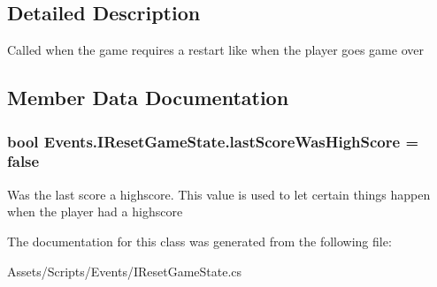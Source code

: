 \subsection{Detailed Description}
Called when the game requires a restart like when the player goes game over 



\subsection{Member Data Documentation}
\subsubsection[{\texorpdfstring{last\+Score\+Was\+High\+Score}{lastScoreWasHighScore}}]{\setlength{\rightskip}{0pt plus 5cm}bool Events.\+I\+Reset\+Game\+State.\+last\+Score\+Was\+High\+Score = false}\hypertarget{class_events_1_1_i_reset_game_state_a8661bddf2fd9a259303c946252fb8658}{}\label{class_events_1_1_i_reset_game_state_a8661bddf2fd9a259303c946252fb8658}


Was the last score a highscore. This value is used to let certain things happen when the player had a highscore 



The documentation for this class was generated from the following file\+:\begin{DoxyCompactItemize}
\item 
Assets/\+Scripts/\+Events/I\+Reset\+Game\+State.\+cs\end{DoxyCompactItemize}

